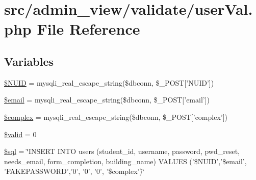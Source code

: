 \hypertarget{userVal_8php}{\section{src/admin\-\_\-view/validate/user\-Val.php \-File \-Reference}
\label{userVal_8php}
}
\subsection*{\-Variables}
\begin{DoxyCompactItemize}
\item 
\hyperlink{userVal_8php_a1a24d1e88ff0d48685fff9c620e4ad9e}{\$\-N\-U\-I\-D} = mysqli\-\_\-real\-\_\-escape\-\_\-string(\$dbconn, \$\-\_\-\-P\-O\-S\-T\mbox{[}'\-N\-U\-I\-D'\mbox{]})
\item 
\hyperlink{userVal_8php_ad634f418b20382e2802f80532d76d3cd}{\$email} = mysqli\-\_\-real\-\_\-escape\-\_\-string(\$dbconn, \$\-\_\-\-P\-O\-S\-T\mbox{[}'email'\mbox{]})
\item 
\hyperlink{userVal_8php_a25ec02534214977602829622b78b5d78}{\$complex} = mysqli\-\_\-real\-\_\-escape\-\_\-string(\$dbconn, \$\-\_\-\-P\-O\-S\-T\mbox{[}'complex'\mbox{]})
\item 
\hyperlink{userVal_8php_a0587674d27d00ef497e08e53ccf45bbb}{\$valid} = 0
\item 
\hyperlink{userVal_8php_a047170d6020a882807665812a27e2525}{\$sql} = \char`\"{}\-I\-N\-S\-E\-R\-T \-I\-N\-T\-O users (student\-\_\-id, username, password, pwd\-\_\-reset, needs\-\_\-email, form\-\_\-completion, building\-\_\-name) \-V\-A\-L\-U\-E\-S ('\$\-N\-U\-I\-D','\$email', '\-F\-A\-K\-E\-P\-A\-S\-S\-W\-O\-R\-D','0', '0', '0', '\$complex')\char`\"{}
\end{DoxyCompactItemize}


